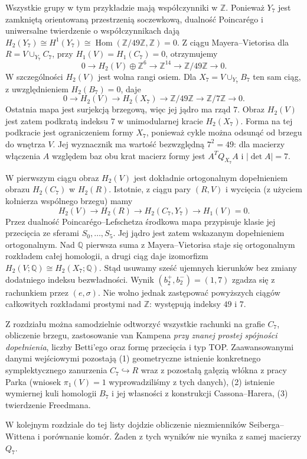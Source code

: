 \begin{przyklad}
Wszystkie grupy w tym przykładzie mają współczynniki
w $\mathbb Z$. Ponieważ $Y_7$ jest zamkniętą
orientowaną przestrzenią soczewkową,
dualność Poincarégo i uniwersalne twierdzenie
o współczynnikach dają
$H_2(Y_7)\cong H^1(Y_7)
\cong\operatorname{Hom}(\mathbb Z/49\mathbb Z,\mathbb Z)=0$. Z ciągu Mayera--Vietorisa
dla $R=V\cup_{Y_7}C_7$, przy $H_1(V)=H_1(C_7)=0$,
otrzymujemy
\[
0\longrightarrow H_2(V)\oplus\mathbb Z^6
\longrightarrow\mathbb Z^{14}
\longrightarrow\mathbb Z/49\mathbb Z\longrightarrow0.
\]
W szczególności $H_2(V)$ jest wolna rangi osiem.
Dla $X_7=V\cup_{Y_7}B_7$ ten sam ciąg,
z uwzględnieniem $H_2(B_7)=0$, daje
\[
0\longrightarrow H_2(V)\longrightarrow H_2(X_7)
\longrightarrow\mathbb Z/49\mathbb Z
\longrightarrow\mathbb Z/7\mathbb Z\longrightarrow0.
\]
Ostatnia mapa jest surjekcją brzegową, więc
jej jądro ma rząd $7$. Obraz $H_2(V)$
jest zatem podkratą indeksu $7$ w unimodularnej
kracie $H_2(X_7)$. Forma na tej podkracie
jest ograniczeniem formy $X_7$, ponieważ cykle
można odsunąć od brzegu do wnętrza $V$.
Jej wyznacznik ma wartość bezwzględną $7^2=49$:
dla macierzy włączenia $A$ względem baz
obu krat macierz formy jest $A^TQ_{X_7}A$
i $|\det A|=7$.

W pierwszym ciągu obraz $H_2(V)$ jest dokładnie
ortogonalnym dopełnieniem obrazu $H_2(C_7)$
w $H_2(R)$. Istotnie, z ciągu pary $(R,V)$
i wycięcia (z użyciem kołnierza wspólnego brzegu) mamy
\[
H_2(V)\longrightarrow H_2(R)
\longrightarrow H_2(C_7,Y_7)\longrightarrow H_1(V)=0.
\]
Przez dualność Poincarégo--Lefschetza środkowa
mapa przypisuje klasie jej przecięcia ze sferami
$S_0,\ldots,S_5$. Jej jądro jest zatem
wskazanym dopełnieniem ortogonalnym.
Nad $\mathbb Q$ pierwsza suma z Mayera--Vietorisa
staje się ortogonalnym rozkładem całej homologii,
a drugi ciąg daje izomorfizm
$H_2(V;\mathbb Q)\cong H_2(X_7;\mathbb Q)$.
Stąd usuwamy sześć ujemnych kierunków
bez zmiany dodatniego indeksu bezwładności.
Wynik $(b_2^+,b_2^-)=(1,7)$ zgadza się
z rachunkiem przez $(e,\sigma)$.
Nie wolno jednak zastępować powyższych
ciągów całkowitych rozkładami prostymi
nad $\mathbb Z$: występują indeksy $49$ i $7$.
\end{przyklad}

\begin{uwaga}
Z rozdziału można samodzielnie odtworzyć wszystkie
rachunki na grafie $C_7$, obliczenie brzegu, zastosowanie
van Kampena \emph{przy znanej prostej spójności dopełnienia},
liczby Betti'ego oraz formę przecięcia i typ TOP.
Zaawansowanymi danymi wejściowymi pozostają
(1) geometryczne istnienie konkretnego symplektycznego
zanurzenia $C_7\hookrightarrow R$ wraz z pozostałą
gałęzią włókna z pracy Parka (wniosek
$\pi_1(V)=1$ wyprowadziliśmy z tych danych),
(2) istnienie wymiernej kuli homologii $B_7$ i jej
własności z konstrukcji Cassona--Harera,
(3) twierdzenie Freedmana.

W kolejnym rozdziale do tej listy dojdzie obliczenie
niezmienników Seiberga--Wittena i porównanie komór.
Żaden z tych wyników nie wynika z samej macierzy $Q_7$.
\end{uwaga}


